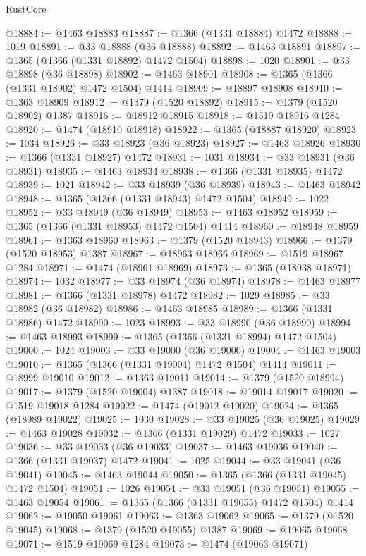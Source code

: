 \begin{lexlean}{RustCore}
\begin{coremodule}
@18884 := @1463 @18883
@18887 := @1366 (@1331 @18884) @1472
@18888 := 1019
@18891 := @33 @18888 (@36 @18888)
@18892 := @1463 @18891
@18897 := @1365 (@1366 (@1331 @18892) @1472 @1504)
@18898 := 1020
@18901 := @33 @18898 (@36 @18898)
@18902 := @1463 @18901
@18908 := @1365 (@1366 (@1331 @18902) @1472 @1504) @1414
@18909 := @18897 @18908
@18910 := @1363 @18909
@18912 := @1379 (@1520 @18892)
@18915 := @1379 (@1520 @18902) @1387
@18916 := @18912 @18915
@18918 := @1519 @18916 @1284
@18920 := @1474 (@18910 @18918)
@18922 := @1365 (@18887 @18920)
@18923 := 1034
@18926 := @33 @18923 (@36 @18923)
@18927 := @1463 @18926
@18930 := @1366 (@1331 @18927) @1472
@18931 := 1031
@18934 := @33 @18931 (@36 @18931)
@18935 := @1463 @18934
@18938 := @1366 (@1331 @18935) @1472
@18939 := 1021
@18942 := @33 @18939 (@36 @18939)
@18943 := @1463 @18942
@18948 := @1365 (@1366 (@1331 @18943) @1472 @1504)
@18949 := 1022
@18952 := @33 @18949 (@36 @18949)
@18953 := @1463 @18952
@18959 := @1365 (@1366 (@1331 @18953) @1472 @1504) @1414
@18960 := @18948 @18959
@18961 := @1363 @18960
@18963 := @1379 (@1520 @18943)
@18966 := @1379 (@1520 @18953) @1387
@18967 := @18963 @18966
@18969 := @1519 @18967 @1284
@18971 := @1474 (@18961 @18969)
@18973 := @1365 (@18938 @18971)
@18974 := 1032
@18977 := @33 @18974 (@36 @18974)
@18978 := @1463 @18977
@18981 := @1366 (@1331 @18978) @1472
@18982 := 1029
@18985 := @33 @18982 (@36 @18982)
@18986 := @1463 @18985
@18989 := @1366 (@1331 @18986) @1472
@18990 := 1023
@18993 := @33 @18990 (@36 @18990)
@18994 := @1463 @18993
@18999 := @1365 (@1366 (@1331 @18994) @1472 @1504)
@19000 := 1024
@19003 := @33 @19000 (@36 @19000)
@19004 := @1463 @19003
@19010 := @1365 (@1366 (@1331 @19004) @1472 @1504) @1414
@19011 := @18999 @19010
@19012 := @1363 @19011
@19014 := @1379 (@1520 @18994)
@19017 := @1379 (@1520 @19004) @1387
@19018 := @19014 @19017
@19020 := @1519 @19018 @1284
@19022 := @1474 (@19012 @19020)
@19024 := @1365 (@18989 @19022)
@19025 := 1030
@19028 := @33 @19025 (@36 @19025)
@19029 := @1463 @19028
@19032 := @1366 (@1331 @19029) @1472
@19033 := 1027
@19036 := @33 @19033 (@36 @19033)
@19037 := @1463 @19036
@19040 := @1366 (@1331 @19037) @1472
@19041 := 1025
@19044 := @33 @19041 (@36 @19041)
@19045 := @1463 @19044
@19050 := @1365 (@1366 (@1331 @19045) @1472 @1504)
@19051 := 1026
@19054 := @33 @19051 (@36 @19051)
@19055 := @1463 @19054
@19061 := @1365 (@1366 (@1331 @19055) @1472 @1504) @1414
@19062 := @19050 @19061
@19063 := @1363 @19062
@19065 := @1379 (@1520 @19045)
@19068 := @1379 (@1520 @19055) @1387
@19069 := @19065 @19068
@19071 := @1519 @19069 @1284
@19073 := @1474 (@19063 @19071)

\end{coremodule}
\end{lexlean}
